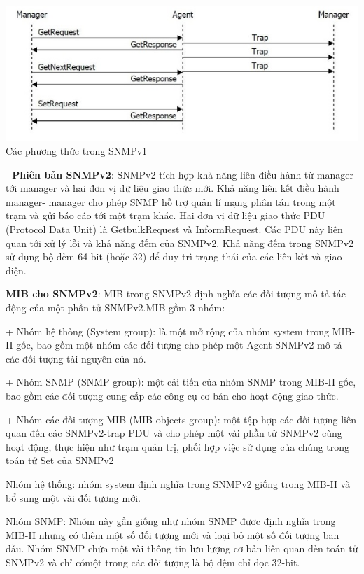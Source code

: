 \documentclass[12pt,oneside,a4paper,reqno]{report}
\begin{document}
\begin{large}
\begin{center}
	\includegraphics[scale=1]{images/snmpv1.jpg}\\
	Các phương thức trong SNMPv1
\end{center}

- \textbf{Phiên bản SNMPv2}: SNMPv2 tích hợp khả năng liên điều hành từ manager tới manager và hai đơn vị dữ liệu giao thức mới. Khả năng liên kết điều hành manager- manager cho phép SNMP hỗ trợ quản lí mạng phân tán trong một trạm và gửi báo cáo tới một trạm khác. Hai đơn vị dữ liệu giao thức PDU (Protocol Data Unit) là GetbulkRequest và InformRequest. Các PDU này liên quan tới xử lý lỗi và khả năng đếm của SNMPv2. Khả năng đếm trong SNMPv2 sử dụng bộ đếm 64 bit (hoặc 32) để duy trì trạng thái của các liên kết và giao diện.

\textbf{MIB cho SNMPv2}: MIB trong SNMPv2 định nghĩa các đối tượng mô tả tác động của một phần tử SNMPv2.MIB gồm 3 nhóm: 

+ Nhóm hệ thống (System group): là một mở rộng của nhóm system trong MIB-II gốc, bao gồm một nhóm các đối tượng cho phép một Agent SNMPv2 mô tả các đối tượng tài nguyên của nó. 

+ Nhóm SNMP (SNMP group): một cải tiến của nhóm SNMP trong MIB-II gốc, bao gồm các đối tượng cung cấp các công cụ cơ bản cho hoạt động giao thức. 

+ Nhóm các đối tượng MIB (MIB objects group): một tập hợp các đối tượng liên quan đến các SNMPv2-trap PDU và cho phép một vài phần tử SNMPv2 cùng hoạt động, thực hiện như trạm quản trị, phối hợp việc sử dụng của chúng trong toán tử Set của SNMPv2 

Nhóm hệ thống: nhóm system định nghĩa trong SNMPv2 giống trong MIB-II và bổ sung một vài đối tượng mới. 

Nhóm SNMP: Nhóm này gần giống như nhóm SNMP đươc định nghĩa trong MIB-II nhưng có thêm một số đối tượng mới và loại bỏ một số đối tượng ban đầu. Nhóm SNMP chứa một vài thông tin lưu lượng cơ bản liên quan đến toán tử SNMPv2 và chỉ cómột trong các đối tượng là bộ đệm chỉ đọc 32-bit.


\end{large}
\end{document}
